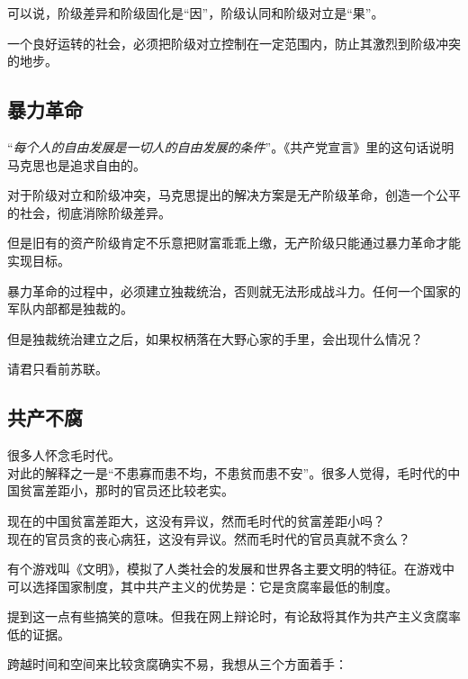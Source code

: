 可以说，阶级差异和阶级固化是“因”，阶级认同和阶级对立是“果”。

一个良好运转的社会，必须把阶级对立控制在一定范围内，防止其激烈到阶级冲突的地步。

\subsection{暴力革命}

“\textit{每个人的自由发展是一切人的自由发展的条件}”。《共产党宣言》里的这句话说明马克思也是追求自由的。

对于阶级对立和阶级冲突，马克思提出的解决方案是无产阶级革命，创造一个公平的社会，彻底消除阶级差异。

但是旧有的资产阶级肯定不乐意把财富乖乖上缴，无产阶级只能通过暴力革命才能实现目标。

暴力革命的过程中，必须建立独裁统治，否则就无法形成战斗力。任何一个国家的军队内部都是独裁的。

但是独裁统治建立之后，如果权柄落在大野心家的手里，会出现什么情况？

请君只看前苏联。

\subsection{共产不腐}

很多人怀念毛时代。\\
对此的解释之一是“不患寡而患不均，不患贫而患不安”。很多人觉得，毛时代的中国贫富差距小，那时的官员还比较老实。

现在的中国贫富差距大，这没有异议，然而毛时代的贫富差距小吗？\\
现在的官员贪的丧心病狂，这没有异议。然而毛时代的官员真就不贪么？

\zPar

有个游戏叫《文明》，模拟了人类社会的发展和世界各主要文明的特征。在游戏中可以选择国家制度，其中共产主义的优势是：它是贪腐率最低的制度。

提到这一点有些搞笑的意味。但我在网上辩论时，有论敌将其作为共产主义贪腐率低的证据。

\zPar

跨越时间和空间来比较贪腐确实不易，我想从三个方面着手：

